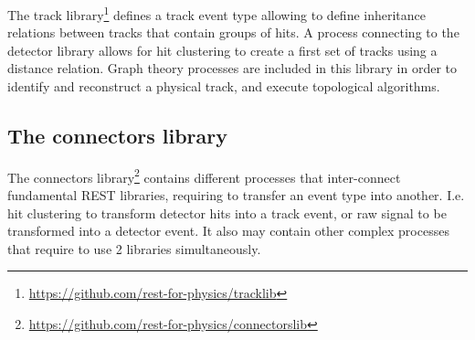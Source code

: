 The track library\footnote{\url{https://github.com/rest-for-physics/tracklib}} defines a track event type allowing to define inheritance relations between tracks that contain groups of hits. A process connecting to the detector library allows for hit clustering to create a first set of tracks using a distance relation. Graph theory processes are included in this library in order to identify and reconstruct a physical track, and execute topological algorithms.

\subsection{The connectors library}

The connectors library\footnote{\url{https://github.com/rest-for-physics/connectorslib}} contains different processes that inter-connect fundamental REST libraries, requiring to transfer an event type into another. I.e. hit clustering to transform detector hits into a track event, or raw signal to be transformed into a detector event. It also may contain other complex processes that require to use 2 libraries simultaneously.

\begin{figure}[hb!]
  \centering
	\caption{}\label{fig:connectorslib}
\end{figure}




